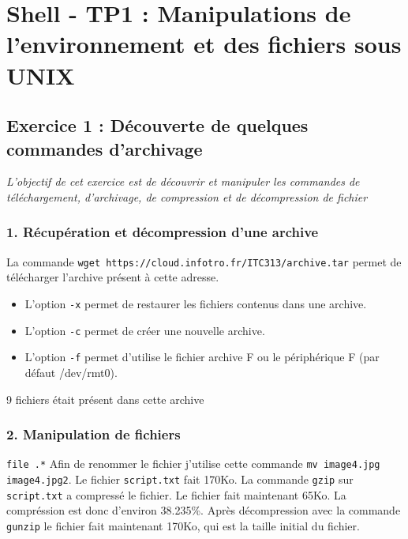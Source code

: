 \chapter{Shell - TP1 : Manipulations de l’environnement et des fichiers sous UNIX}
    \section{Exercice 1 : Découverte de quelques commandes d'archivage}
	\textit{L'objectif de cet exercice est de découvrir et manipuler les commandes de téléchargement, d'archivage, de compression et de décompression de fichier}
        \subsection{1. Récupération et décompression d'une archive}
            La commande \texttt{wget https://cloud.infotro.fr/ITC313/archive.tar} permet de télécharger l'archive présent à cette adresse.
            \begin{itemize}
                \item L'option \texttt{-x} permet de restaurer les fichiers contenus dans une archive.
                \item L'option \texttt{-c} permet de créer une nouvelle archive.
                \item L'option \texttt{-f} permet d'utilise le fichier archive F ou le périphérique F (par défaut /dev/rmt0).
            \end{itemize}
            9 fichiers était présent dans cette archive
        \subsection{2. Manipulation de fichiers}
            \texttt{file .\/*}
            Afin de renommer le fichier j'utilise cette commande \texttt{mv image4.jpg image4.jpg2}.
            Le fichier \texttt{script.txt} fait 170Ko.
            La commande \texttt{gzip} sur \texttt{script.txt} a compressé le fichier.
            Le fichier fait maintenant  65Ko.
            La compréssion est donc d'environ 38.235\%.
            Après décompression avec la commande \texttt{gunzip} le fichier fait maintenant 170Ko, qui est la taille initial du fichier.
